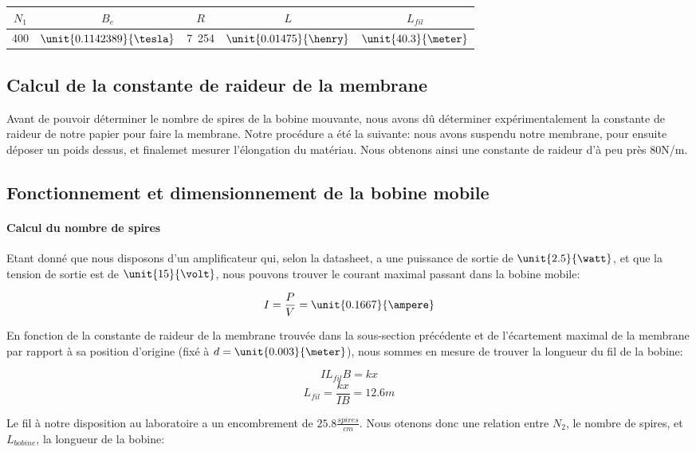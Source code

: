 \begin{center}
	\begin{tabular}{c|c|c|c|c}
		$N_1$ & $B_e$ & $R$ & $L$ & $L_{fil}$ \\
		\hline
		400 & $\unit{0.1142389}{\tesla}$ & \unit{7.254}{\ohm} & $\unit{0.01475}{\henry}$ & $\unit{40.3}{\meter}$\\
	\end{tabular}
\end{center}

\subsection{Calcul de la constante de raideur de la membrane}
Avant de pouvoir déterminer le nombre de spires de la bobine mouvante, nous avons dû déterminer
expérimentalement la constante de raideur de notre papier pour faire la membrane.
Notre procédure a été la suivante: nous avons suspendu notre membrane, pour ensuite 
déposer un poids dessus, et finalemet mesurer l'élongation du matériau.
Nous obtenons ainsi une constante de raideur d'à peu près \unit {80}{N/m}.

\subsection{Fonctionnement et dimensionnement de la bobine mobile}

\paragraph{Calcul du nombre de spires}
Etant donné que nous disposons d'un amplificateur qui, selon la datasheet, a une puissance de sortie de 
$\unit{2.5}{\watt}$, et que la tension de sortie est de $\unit{15}{\volt}$, nous pouvons trouver le courant
maximal passant dans la bobine mobile:

$$I = \frac{P}{V} = \unit{0.1667}{\ampere}$$

En fonction de la constante de raideur de la membrane trouvée dans la sous-section précédente et de l'écartement
maximal de la membrane par rapport à sa position d'origine (fixé à $d = \unit{0.003}{\meter}$), nous sommes en
mesure de trouver la longueur du fil de la bobine:

$$IL_{fil}B = kx$$
$$L_{fil} = \frac{kx}{IB} = 12.6 m$$

Le fil à notre disposition au laboratoire a un encombrement de $\unit{25.8}{\frac{spires}{cm}}$. Nous otenons 
donc une relation entre $N_2$, le nombre de spires, et $L_{bobine}$, la longueur de la bobine:

